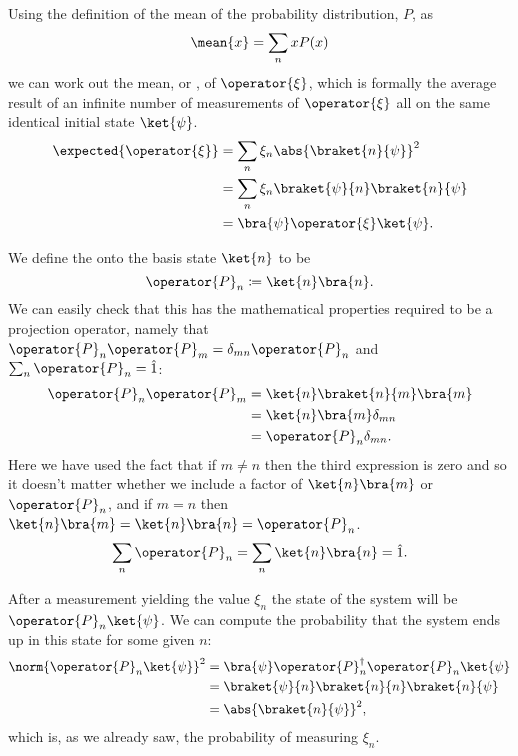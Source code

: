 \documentclass[fleqn]{NotesClass}
\newcommand*{\idop}{\hat{1}}
\newcommand*{\hermit}{\dagger}
\begin{document}
    Using the definition of the mean of the probability distribution, \(P\), as
    \begin{equation}
        \mean{x} = \sum_n xP(x)
    \end{equation}
    we can work out the mean, or , of \(\operator{\xi}\), which is formally the average result of an infinite number of measurements of \(\operator{\xi}\) all on the same identical initial state \(\ket{\psi}\).
    \begin{align}
        \expected{\operator{\xi}} &= \sum_n \xi_n \abs{\braket{n}{\psi}}^2\\
        &= \sum_n \xi_n \braket{\psi}{n}\braket{n}{\psi}\\
        &= \bra{\psi}\operator{\xi}\ket{\psi}.
    \end{align}
    
    We define the  onto the basis state \(\ket{n}\) to be
    \begin{equation}
        \operator{P}_n \coloneqq \ket{n}\bra{n}.
    \end{equation}
    We can easily check that this has the mathematical properties required to be a projection operator, namely that \(\operator{P}_n\operator{P}_m = \delta_{mn}\operator{P}_n\) and \(\sum_n \operator{P}_n = \idop\):
    \begin{align}
        \operator{P}_n\operator{P}_m &= \ket{n}\braket{n}{m}\bra{m}\\
        &= \ket{n}\bra{m}\delta_{mn}\\
        &= \operator{P}_n\delta_{mn}.
    \end{align}
    Here we have used the fact that if \(m\ne n\) then the third expression is zero and so it doesn't matter whether we include a factor of \(\ket{n}\bra{m}\) or \(\operator{P}_n\), and if \(m = n\) then \(\ket{n}\bra{m} = \ket{n}\bra{n} = \operator{P}_n\).
    \begin{align}
        \sum_n \operator{P}_n = \sum_n \ket{n}\bra{n} = \idop.
    \end{align}
    
    After a measurement yielding the value \(\xi_n\) the state of the system will be \(\operator{P}_n\ket{\psi}\).
    We can compute the probability that the system ends up in this state for some given \(n\):
    \begin{align}
        \norm{\operator{P}_n\ket{\psi}}^2 &= \bra{\psi}\operator{P}_n^\hermit \operator{P}_n\ket{\psi}\\
        &= \braket{\psi}{n}\braket{n}{n}\braket{n}{\psi}\\
        &= \abs{\braket{n}{\psi}}^2,
    \end{align}
    which is, as we already saw, the probability of measuring \(\xi_n\).
    
\end{document}
